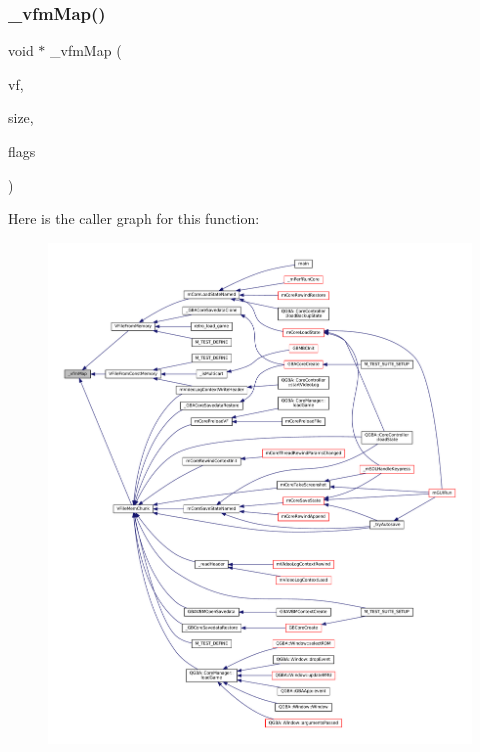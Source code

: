 \subsubsection{\texorpdfstring{\+\_\+vfm\+Map()}{\_vfmMap()}}
{\footnotesize\ttfamily void $\ast$ \+\_\+vfm\+Map (\begin{DoxyParamCaption}\item[{struct V\+File $\ast$}]{vf,  }\item[{size\+\_\+t}]{size,  }\item[{\mbox{\hyperlink{ioapi_8h_a787fa3cf048117ba7123753c1e74fcd6}{int}}}]{flags }\end{DoxyParamCaption})\hspace{0.3cm}{\ttfamily [static]}}

Here is the caller graph for this function\+:
\nopagebreak
\begin{figure}[H]
\begin{center}
\leavevmode
\includegraphics[width=350pt]{vfs-mem_8c_a0e3ab05b9cdddc0a3e3881c2e5fd8ebd_icgraph}
\end{center}
\end{figure}
\mbox{\label{vfs-mem_8c_a2df17620d537539e814f3c9e83d13f2b}} 
